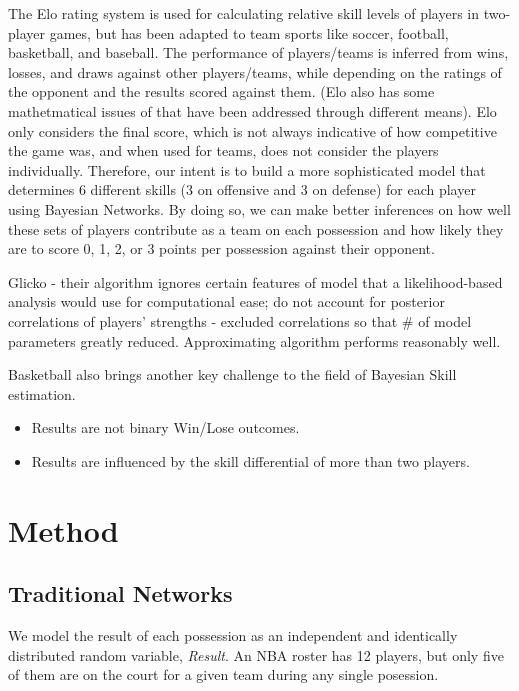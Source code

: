 \documentclass[10pt,twocolumn]{article}
\begin{document}
The Elo rating system is used for calculating relative skill levels of players in two-player games, but has been adapted to team sports like soccer, football, basketball, and baseball. The performance of players/teams is inferred from wins, losses, and draws against other players/teams, while depending on the ratings of the opponent and the results scored against them. (Elo also has some mathetmatical issues of that have been addressed through different means). Elo only considers the final score, which is not always indicative of how competitive the game was, and when used for teams, does not consider the players individually. Therefore, our intent is to build a more sophisticated model that determines 6 different skills (3 on offensive and 3 on defense) for each player using Bayesian Networks. By doing so, we can make better inferences on how well these sets of players contribute as a team on each possession and how likely they are to score 0, 1, 2, or 3 points per possession against their opponent. 

Glicko - their algorithm ignores certain features of model that a likelihood-based analysis would use for computational ease; do not account for posterior correlations of players' strengths - excluded correlations so that \# of model parameters greatly reduced. 
Approximating algorithm performs reasonably well. 

Basketball also brings another key challenge to the field of Bayesian Skill estimation.
\begin{itemize}
\item Results are not binary Win/Lose outcomes.
\item Results are influenced by the skill differential of more than two players.
\end{itemize}




\section{Method}
\subsection{Traditional Networks}

We model the result of each possession as an independent and identically distributed random variable, \emph{Result}.
An NBA roster has 12 players, but only five of them are on the court for a given team during any single posession.
\end{document}
